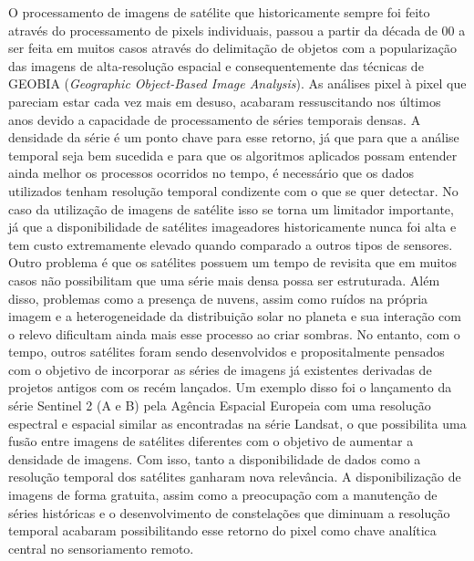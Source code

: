 \documentclass[12pt,a4paper]{article}
\begin{document}
O processamento de imagens de satélite que historicamente sempre foi feito através do processamento de pixels individuais, passou a partir da década de 00 a ser feita em muitos casos através do delimitação de objetos com a popularização das imagens de alta-resolução espacial e consequentemente das técnicas de GEOBIA (\textit{Geographic Object-Based Image Analysis}). As análises pixel à pixel que pareciam estar cada vez mais em desuso, acabaram ressuscitando nos últimos anos devido a capacidade de processamento de séries temporais densas. A densidade da série é um ponto chave para esse retorno, já que para que a análise temporal seja bem sucedida e para que os algoritmos aplicados possam entender ainda melhor os processos ocorridos no tempo, é necessário que os dados utilizados tenham resolução temporal condizente com o que se quer detectar. No caso da utilização de imagens de satélite isso se torna um limitador importante, já que a disponibilidade de satélites imageadores historicamente nunca foi alta e tem custo extremamente elevado quando comparado a outros tipos de sensores. Outro problema é que os satélites possuem um tempo de revisita que em muitos casos não possibilitam que uma série mais densa possa ser estruturada. 
Além disso, problemas como a presença de nuvens, assim como ruídos na própria imagem e a heterogeneidade da distribuição solar no planeta e sua interação com o relevo dificultam ainda mais esse processo ao criar sombras. No entanto, com o tempo, outros satélites foram sendo desenvolvidos e propositalmente pensados com o objetivo de incorporar as séries de imagens já existentes derivadas de projetos antigos com os recém lançados. Um exemplo disso foi o lançamento da série Sentinel 2 (A e B) pela Agência Espacial Europeia com uma resolução espectral e espacial similar as encontradas na série Landsat, o que possibilita uma fusão entre imagens de satélites diferentes com o objetivo de aumentar a densidade de imagens. Com isso, tanto a disponibilidade de dados como a resolução temporal dos satélites ganharam nova relevância. A disponibilização de imagens de forma gratuita, assim como a preocupação com a manutenção de séries históricas e o desenvolvimento de constelações que diminuam a resolução temporal acabaram possibilitando esse retorno do pixel como chave analítica central no sensoriamento remoto.
\end{document}
